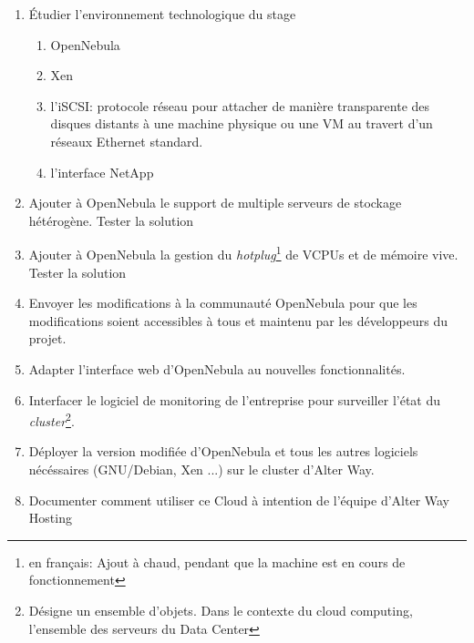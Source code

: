\begin{enumerate}
	\item Étudier l'environnement technologique du stage
		\begin{enumerate}
		\item OpenNebula
		\item Xen
		\item l'iSCSI: protocole réseau pour attacher de manière transparente des disques distants à une machine physique ou une VM
			au travert d'un réseaux Ethernet standard.
		\item l'interface NetApp
		\end{enumerate}
	\item Ajouter à OpenNebula le support de multiple serveurs de stockage hétérogène.
		\subitem Tester la solution
	\item Ajouter à OpenNebula la gestion du \emph{hotplug}\footnote{en français: Ajout à chaud, pendant que la machine est en cours de fonctionnement}
		de VCPUs et de mémoire vive.
		\subitem Tester la solution
	\item Envoyer les modifications à la communauté OpenNebula pour que les modifications soient accessibles à tous et maintenu par les développeurs du projet.
	\item Adapter l'interface web d'OpenNebula au nouvelles fonctionnalités.
	\item Interfacer le logiciel de monitoring de l'entreprise pour surveiller l'état du \emph{cluster}\footnote{Désigne un ensemble d'objets. Dans le contexte
	du cloud computing, l'ensemble des serveurs du Data Center}.
	\item Déployer la version modifiée d'OpenNebula et tous les autres logiciels nécéssaires (GNU/Debian, Xen ...) sur le cluster d'Alter Way.
	\item Documenter comment utiliser ce Cloud à intention de l'équipe d'Alter Way Hosting
\end{enumerate}

